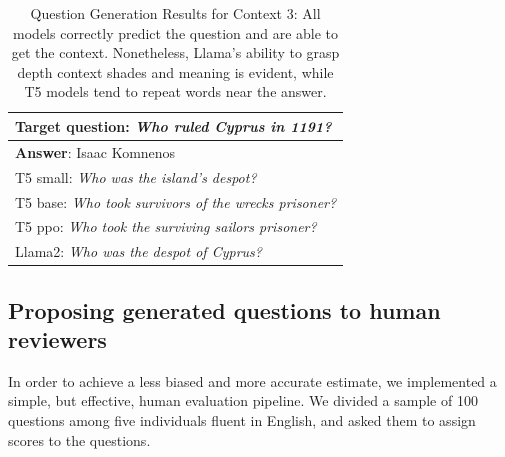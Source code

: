 \documentclass{article}
\begin{document}
\begin{table}[h]
\centering
\begin{tabularx}{\linewidth}{X}
\toprule
\textbf{Target question}: \textit{Who ruled Cyprus in 1191?} \\
\midrule 
\textbf{Answer}: Isaac Komnenos\\
\midrule
T5 small: \textit{Who was the island's despot?}\\
T5 base: \textit{Who took survivors of the wrecks prisoner?} \\
T5 ppo: \textit{Who took the surviving sailors prisoner?}\\
Llama2: \textit{Who was the despot of Cyprus?}\\
\midrule
\bottomrule
\end{tabularx}
\caption{Question Generation Results for Context 3: All models correctly predict the question and are able to get the context. Nonetheless, Llama's ability to grasp depth context shades and meaning is evident, while T5 models tend to repeat words near the answer.}
\label{table:q3}
\end{table}

\subsection{Proposing generated questions to human reviewers}
In order to achieve a less biased and more accurate estimate, we implemented a simple, but effective, human evaluation pipeline. We divided a sample of 100 questions among five individuals fluent in English, and asked them to assign scores to the questions.
\end{document}
